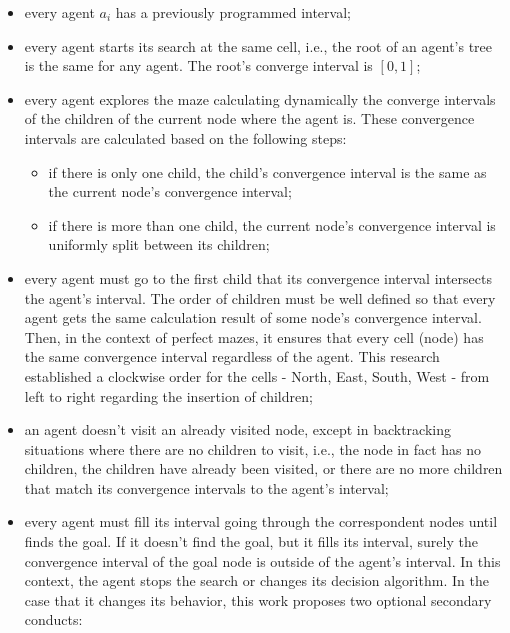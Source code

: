 \begin{itemize}
\item every agent $a_{i}$ has a previously programmed interval;

\item every agent starts its search at the same cell, i.e., the root of an agent's tree is the same for any agent. The root's converge interval is $[0,1]$;

\item every agent explores the maze calculating dynamically the converge intervals of the children of the current node where the agent is. These convergence intervals are calculated based on the following steps:

	\begin{itemize}

	\item if there is only one child, the child's convergence interval is the same as the current node's convergence interval;
	
	\item if there is more than one child, the current node's convergence interval is uniformly split between its children;
	
	\end{itemize}
	
\item every agent must go to the first child that its convergence interval intersects the agent's interval. The order of children must be well defined so that every agent gets the same calculation result of some node's convergence interval. Then, in the context of perfect mazes, it ensures that every cell (node) has the same convergence interval regardless of the agent. This research established a clockwise order for the cells - North, East, South, West - from left to right regarding the insertion of children;

\item an agent doesn't visit an already visited node, except in backtracking situations where there are no children to visit, i.e., the node in fact has no children, the children have already been visited, or there are no more children that match its convergence intervals to the agent's interval;

\item every agent must fill its interval going through the correspondent nodes until finds the goal. If it doesn't find the goal, but it fills its interval, surely the convergence interval of the goal node is outside of the agent's interval. In this context, the agent stops the search or changes its decision algorithm. In the case that it changes its behavior, this work proposes two optional secondary conducts:


\end{itemize}
